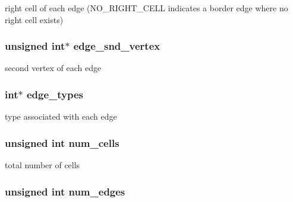 right cell of each edge (NO\_\-RIGHT\_\-CELL indicates a border edge where no right cell exists) 

\hypertarget{structFVL_1_1CFVMesh2D_1_1CFVMesh2D__cuda_a656712266e15816d723aae1c64411c52}{
\subsubsection[{edge\_\-snd\_\-vertex}]{\setlength{\rightskip}{0pt plus 5cm}unsigned int$\ast$ {\bf edge\_\-snd\_\-vertex}}}
\label{d6/d30/structFVL_1_1CFVMesh2D_1_1CFVMesh2D__cuda_a656712266e15816d723aae1c64411c52}


second vertex of each edge 

\hypertarget{structFVL_1_1CFVMesh2D_1_1CFVMesh2D__cuda_a6a62f4029cdd76f0ca586851d6eaf684}{
\subsubsection[{edge\_\-types}]{\setlength{\rightskip}{0pt plus 5cm}int$\ast$ {\bf edge\_\-types}}}
\label{d6/d30/structFVL_1_1CFVMesh2D_1_1CFVMesh2D__cuda_a6a62f4029cdd76f0ca586851d6eaf684}


type associated with each edge 

\hypertarget{structFVL_1_1CFVMesh2D_1_1CFVMesh2D__cuda_aede6f897b05f909a426f36f61b2b8d43}{
\subsubsection[{num\_\-cells}]{\setlength{\rightskip}{0pt plus 5cm}unsigned int {\bf num\_\-cells}}}
\label{d6/d30/structFVL_1_1CFVMesh2D_1_1CFVMesh2D__cuda_aede6f897b05f909a426f36f61b2b8d43}


total number of cells 

\hypertarget{structFVL_1_1CFVMesh2D_1_1CFVMesh2D__cuda_ad1228ae08a3c287de40e4682e6538c12}{
\subsubsection[{num\_\-edges}]{\setlength{\rightskip}{0pt plus 5cm}unsigned int {\bf num\_\-edges}}}
\label{d6/d30/structFVL_1_1CFVMesh2D_1_1CFVMesh2D__cuda_ad1228ae08a3c287de40e4682e6538c12}


